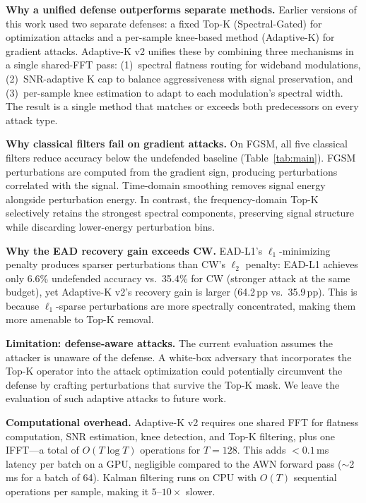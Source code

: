 \textbf{Why a unified defense outperforms separate methods.}
Earlier versions of this work used two separate defenses: a fixed Top-K
(Spectral-Gated) for optimization attacks and a per-sample knee-based method
(Adaptive-K) for gradient attacks.  Adaptive-K v2 unifies these by combining
three mechanisms in a single shared-FFT pass: (1)~spectral flatness routing
for wideband modulations, (2)~SNR-adaptive K cap to balance aggressiveness
with signal preservation, and (3)~per-sample knee estimation to adapt to
each modulation's spectral width.  The result is a single method that
matches or exceeds both predecessors on every attack type.

\textbf{Why classical filters fail on gradient attacks.}
On FGSM, all five classical filters reduce accuracy below the undefended
baseline (Table~\ref{tab:main}).  FGSM perturbations are computed from the
gradient sign, producing perturbations correlated with the signal.
Time-domain smoothing removes signal energy alongside perturbation energy.
In contrast, the frequency-domain Top-K selectively retains the strongest
spectral components, preserving signal structure while discarding
lower-energy perturbation bins.

\textbf{Why the EAD recovery gain exceeds CW.}
EAD-L1's $\ell_1$-minimizing penalty produces sparser perturbations than
CW's $\ell_2$ penalty: EAD-L1 achieves only 6.6\% undefended accuracy vs.\
35.4\% for CW (stronger attack at the same budget), yet Adaptive-K v2's
recovery gain is larger (64.2\,pp vs.\ 35.9\,pp).  This is because
$\ell_1$-sparse perturbations are more spectrally concentrated, making them
more amenable to Top-K removal.

\textbf{Limitation: defense-aware attacks.}
The current evaluation assumes the attacker is unaware of the defense.
A white-box adversary that incorporates the Top-K operator into the attack
optimization could potentially circumvent the defense by crafting perturbations
that survive the Top-K mask.  We leave the evaluation of such adaptive attacks
to future work.

\textbf{Computational overhead.}
Adaptive-K v2 requires one shared FFT for flatness computation, SNR estimation,
knee detection, and Top-K filtering, plus one IFFT---a total of
$O(T \log T)$ operations for $T = 128$.  This adds $<0.1$\,ms latency per
batch on a GPU, negligible compared to the AWN forward pass ($\sim$2\,ms for
a batch of 64).  Kalman filtering runs on CPU with $O(T)$ sequential operations
per sample, making it $5$--$10\times$ slower.
